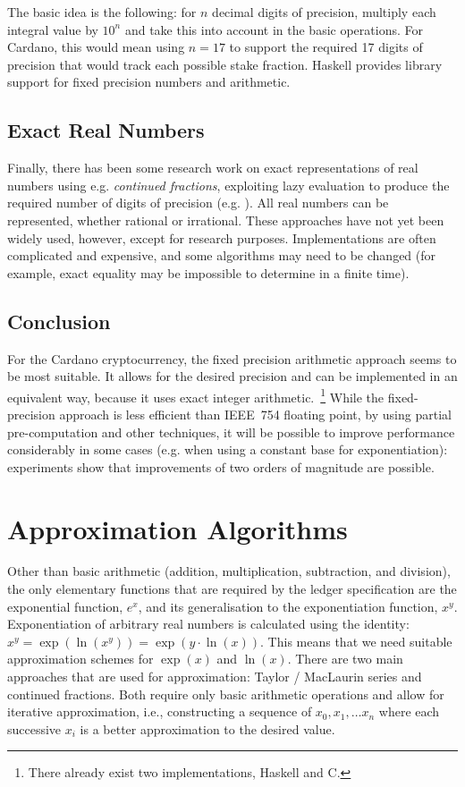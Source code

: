 \documentclass[11pt,a4paper,dvipsnames,twosided]{article}
\theoremstyle{definition}
\theoremstyle{definition}
\begin{document}
The basic idea is the following: for $n$ decimal digits of precision, multiply
each integral value by $10^{n}$ and take this into account in the basic
operations. For Cardano, this would mean using $n=17$ to support the required 17
digits of precision that would track each possible stake fraction.  Haskell
provides library support for fixed precision numbers and arithmetic.

\subsection{Exact Real Numbers}

Finally, there has been some research work on exact representations of real
numbers using e.g. \emph{continued fractions}, exploiting lazy evaluation to
produce the required number of digits of precision
(e.g. \cite{DBLP:journals/tcs/Escardo96}).  All real numbers can be represented,
whether rational or irrational.  These approaches have not yet been widely used,
however, except for research purposes.  Implementations are often complicated
and expensive, and some algorithms may need to be changed (for example, exact
equality may be impossible to determine in a finite time).

\subsection{Conclusion}
\label{sec:summary}

For the Cardano cryptocurrency, the fixed precision arithmetic approach
seems to be most suitable. It allows for the desired precision and can be
implemented in an equivalent way, because it uses exact integer
arithmetic.~\footnote{There already exist two implementations, Haskell and C.}
While the fixed-precision approach is less efficient than IEEE~754 floating point,
by using partial pre-computation and other techniques, it will be possible to improve performance considerably in
some cases (e.g. when using a constant base for exponentiation): experiments show that improvements
of two orders of magnitude are possible.

\section{Approximation Algorithms}
\label{sec:algorithms}

Other than basic arithmetic (addition, multiplication, subtraction, and
division), the only elementary functions that are required by the ledger
specification are the exponential function, $e^{x}$, and its generalisation to
the exponentiation function, $x^{y}$. Exponentiation of arbitrary real numbers
is calculated using the identity:
$x^{y}= \exp({\ln(x^{y})}) = \exp(y\cdot \ln(x))$. This means that we need
suitable approximation schemes for $\exp(x)$ and $\ln(x)$.
%
There are two main approaches that are used for approximation: Taylor / MacLaurin series and
continued fractions. Both require only basic arithmetic operations and allow for
iterative approximation, i.e., constructing a sequence of $x_{0},x_{1},\ldots
x_{n}$ where each successive $x_{i}$ is a better
approximation to the desired value.
\end{document}
